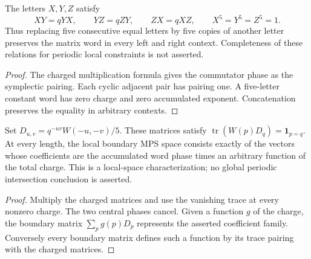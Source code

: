 \begin{lemma}
    \label{lem:short_volume_weyl_letter_relations}
    \leanok
    The letters $X,Y,Z$ satisfy
    \[
        XY=qYX,\qquad YZ=qZY,\qquad ZX=qXZ,
        \qquad X^5=Y^5=Z^5=1.
    \]
    Thus replacing five consecutive equal letters by five copies of
    another letter preserves the matrix word in every left
    and right context. Completeness of these relations for periodic
    local constraints is not asserted.
\end{lemma}
\begin{proof}\leanok
    The charged multiplication formula gives the commutator phase as
    the symplectic pairing. Each cyclic adjacent pair has pairing one.
    A five-letter constant word has zero charge and zero accumulated
    exponent. Concatenation preserves the equality in arbitrary contexts.
\end{proof}

\begin{lemma}
    \label{lem:short_volume_weyl_local_spaces}
    \leanok
    Set $D_{u,v}=q^{-uv}W(-u,-v)/5$. These matrices satisfy
    $\operatorname{tr}(W(p)D_q)=\mathbf1_{p=q}$.
    At every length, the local boundary MPS space consists
    exactly of the vectors whose coefficients are the accumulated
    word phase times an arbitrary function of the total charge.
    This is a local-space characterization; no global periodic
    intersection conclusion is asserted.
\end{lemma}
\begin{proof}\leanok
    Multiply the charged matrices and use the vanishing trace
    at every nonzero charge. The two central phases cancel.
    Given a function $g$ of the charge, the boundary matrix
    $\sum_p g(p)D_p$ represents the asserted coefficient family.
    Conversely every boundary matrix defines such a function by
    its trace pairing with the charged matrices.
\end{proof}

